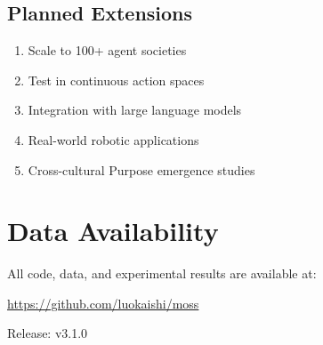 \documentclass{article}
\begin{document}
\subsection{Planned Extensions}
\begin{enumerate}
    \item Scale to 100+ agent societies
    \item Test in continuous action spaces
    \item Integration with large language models
    \item Real-world robotic applications
    \item Cross-cultural Purpose emergence studies
\end{enumerate}

\section*{Data Availability}

All code, data, and experimental results are available at:
\begin{center}
\url{https://github.com/luokaishi/moss}
\end{center}

Release: v3.1.0
\end{document}
